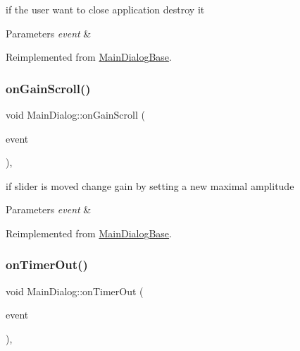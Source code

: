 if the user want to close application destroy it 


\begin{DoxyParams}{Parameters}
{\em event} & \\
\hline
\end{DoxyParams}


Reimplemented from \hyperlink{classMainDialogBase}{Main\+Dialog\+Base}.

\mbox{\label{classMainDialog_a6c56256388bab3fe16995c722a072d33}} 
\subsubsection{\texorpdfstring{on\+Gain\+Scroll()}{onGainScroll()}}
{\footnotesize\ttfamily void Main\+Dialog\+::on\+Gain\+Scroll (\begin{DoxyParamCaption}\item[{wx\+Scroll\+Event \&}]{event }\end{DoxyParamCaption})\hspace{0.3cm}{\ttfamily [protected]}, {\ttfamily [virtual]}}



if slider is moved change gain by setting a new maximal amplitude 


\begin{DoxyParams}{Parameters}
{\em event} & \\
\hline
\end{DoxyParams}


Reimplemented from \hyperlink{classMainDialogBase}{Main\+Dialog\+Base}.

\mbox{\label{classMainDialog_a562ef211b7cfd5ae24a9f04f41ccb67e}} 
\subsubsection{\texorpdfstring{on\+Timer\+Out()}{onTimerOut()}}
{\footnotesize\ttfamily void Main\+Dialog\+::on\+Timer\+Out (\begin{DoxyParamCaption}\item[{wx\+Timer\+Event \&}]{event }\end{DoxyParamCaption})\hspace{0.3cm}{\ttfamily [protected]}, {\ttfamily [virtual]}}



